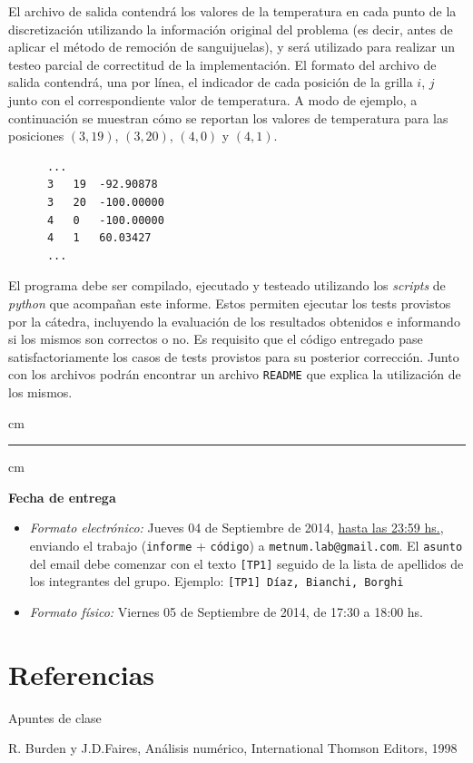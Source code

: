 \documentclass[spanish,a4paper]{article}
\begin{document}
El archivo de salida contendr\'a los valores de la temperatura en cada punto de la discretizaci\'on utilizando la informaci\'on original del problema (es decir, antes de aplicar el m\'etodo de remoci\'on de sanguijuelas), y ser\'a utilizado para realizar un testeo parcial de correctitud de la implementaci\'on. El formato del archivo de salida contendr\'a, una por l\'inea, el indicador de cada posici\'on de la grilla $i$, $j$ junto con el correspondiente valor de temperatura. A modo de ejemplo, a continuaci\'on se muestran c\'omo se reportan los valores de temperatura para las posiciones $(3,19)$, $(3,20)$, $(4,0)$ y $(4,1)$. 

\begin{verbatim}
      ...
      3   19  -92.90878
      3   20  -100.00000
      4   0   -100.00000
      4   1   60.03427
      ...
\end{verbatim}

El programa debe ser compilado, ejecutado y testeado utilizando los \emph{scripts} de \emph{python} que acompa\~nan este informe. Estos permiten ejecutar los tests provistos por la c\'atedra, incluyendo la evaluaci\'on de los resultados obtenidos e informando si los mismos son correctos o no. Es requisito que el c\'odigo entregado pase satisfactoriamente los casos de tests provistos para su posterior correcci\'on. Junto con los archivos podr\'an encontrar un archivo \texttt{README} que explica la utilizaci\'on de los mismos.

 cm
\hrule
{} cm

{\bf Fecha de entrega} 
\begin{itemize}
\item \textsl{Formato electr\'onico:} Jueves 04 de Septiembre de 2014, \underline{hasta las 23:59 hs.}, enviando el trabajo
(\texttt{informe} + \texttt{c\'odigo}) a \texttt{metnum.lab@gmail.com}. El \texttt{asunto} del email debe comenzar con el texto \verb|[TP1]| seguido
de la lista de apellidos de los integrantes del grupo. Ejemplo: \texttt{[TP1] D\'iaz, Bianchi, Borghi}
\item \textsl{Formato f\'isico:} Viernes 05 de Septiembre de 2014, de 17:30 a 18:00 hs.
\end{itemize}

\newpage

\section{Referencias}
\label{sec:ref}

Apuntes de clase

R. Burden y J.D.Faires, Análisis numérico, International Thomson Editors, 1998
\end{document}

